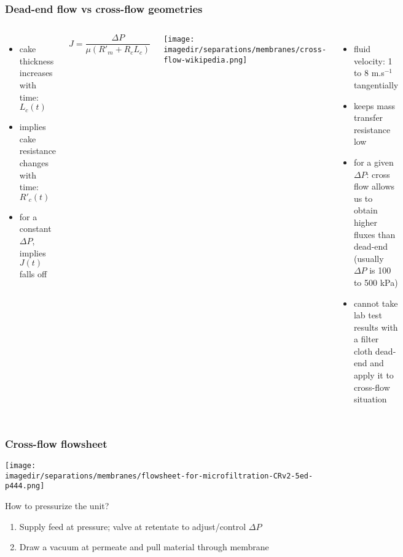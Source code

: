 \begin{frame}\frametitle{Dead-end flow vs cross-flow geometries}
	\begin{columns}[t]
			{\color{myBlue}{Dead-end flow}}
			\begin{itemize}
				\item	cake thickness increases with time: $L_c(t)$
				\item	implies cake resistance changes with time: $R'_c(t)$
				\item	for a constant $\Delta P$, implies $J(t)$ falls off
			\end{itemize}
			\vspace{12pt}
			\begin{exampleblock}{}
					\[
						J = \displaystyle \frac{\Delta P}{\mu \left(R'_m + R_c L_c\right)} 
					\]
			\end{exampleblock}			
			{\color{myBlue}{Cross-flow}}
			\begin{center}
				\texttt{[image: \\imagedir/separations/membranes/cross-flow-wikipedia.png]}
			\end{center}
			\vspace{-12pt}
			\begin{itemize}
				\item	fluid velocity: 1 to 8 m.s$^{-1}$ tangentially
				\item	keeps mass transfer resistance low
				\item	for a given $\Delta P$: cross flow allows us to obtain higher fluxes than dead-end (usually $\Delta P$ is 100 to 500 kPa)
				\item	cannot take lab test results with a filter cloth dead-end and apply it to cross-flow situation
			\end{itemize}
	\end{columns}
\end{frame}

\begin{frame}\frametitle{Cross-flow flowsheet}
	\begin{center}
		\texttt{[image: \\imagedir/separations/membranes/flowsheet-for-microfiltration-CRv2-5ed-p444.png]}
	\end{center}
	
	\vspace{-12pt}
	How to pressurize the unit?	
	\begin{enumerate}
		\item	\small Supply feed at pressure; valve at retentate to adjust/control $\Delta P$
		\item	Draw a vacuum at permeate and pull material through membrane
	\end{enumerate}
\end{frame}

